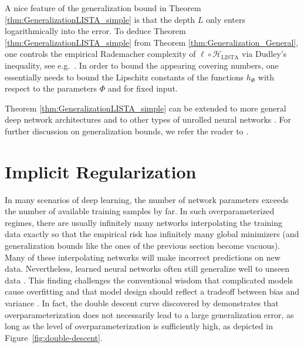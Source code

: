 \documentclass{svproc}
\newcommand{\corr}[1]{#1}
\newcommand{\0}{\boldsymbol{0}}
\newcommand{\1}{\boldsymbol{1}}
\newcommand{\calH}{\mathcal{H}}
\def\calH{\mathcal{H}}
\begin{document}
A nice feature of the generalization bound in Theorem \ref{thm:GeneralizationLISTA_simple} is that the depth $L$ only enters logarithmically into the error. To deduce Theorem \ref{thm:GeneralizationLISTA_simple} from Theorem \ref{thm:Generalization_General}, one controls the empirical Rademacher complexity of $\ell \circ \calH_{\text{LISTA}}$ via 
Dudley's inequality, see e.g.\ \cite{foucart2013mathematical}. 
In order to bound the appearing covering numbers, one essentially needs to bound the Lipschitz constants of the functions $h_\Phi$
with respect to the parameters $\Phi$ and for fixed input.

Theorem \ref{thm:GeneralizationLISTA_simple} can be extended to more general deep network architectures \cite{schnoor2023generalization} and to other types of unrolled neural networks \cite{kouni25}.
For further discussion on generalization bounds, we refer the reader to \cite{jiang2019fantastic,behboodi2022compressive,schnoor2023generalization,shalev2014understanding,mohri2018foundations,kouni25}.


\section{Implicit Regularization}
\label{sec:implicit-reg}

In many scenarios of deep learning, the number of network parameters exceeds the number of available training samples by far. In such overparameterized regimes, there are usually infinitely many networks interpolating the training data exactly so that the empirical risk has infinitely many global minimizers (and generalization bounds like the ones of the previous section become vacuous).
Many of these interpolating networks will make \corr{incorrect} predictions on new data.
Nevertheless, learned neural networks often still generalize well to unseen data \cite{zhang2017understanding}. This finding challenges the \corr{conventional} wisdom that complicated models \corr{cause} overfitting \cite{hastie2001elements} and \corr{that} model design should reflect a tradeoff between bias and variance \cite{geman1992neural,kohavi1996bias}. In fact, the double descent curve discovered by \cite{belkin2020double} demonstrates that overparameterization does not necessarily lead to \corr{a} large generalization error, as long as the level of overparameterization is sufficiently high, as depicted in Figure~\ref{fig:double-descent}.
\end{document}

